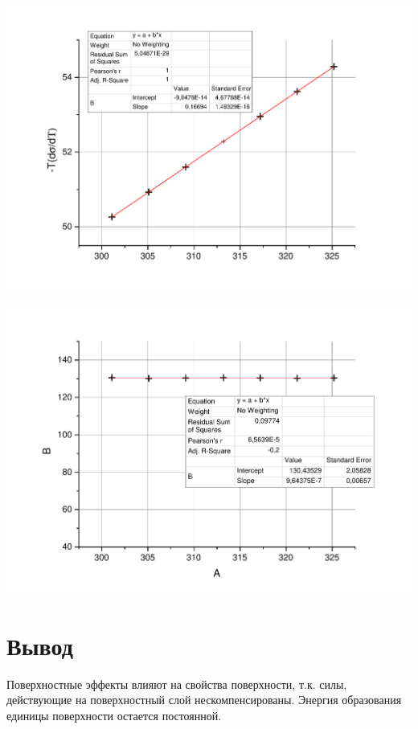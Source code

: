 \documentclass[a4paper,12pt]{article}
\begin{document}
	\includegraphics[width = 0.7\linewidth]{TdsigmadT}
	
	\includegraphics[width = 0.7\linewidth]{Up}
	\section{Вывод}
	Поверхностные эффекты влияют на свойства поверхности, т.к. силы, действующие на поверхностный слой нескомпенсированы. Энергия образования единицы поверхности остается постоянной. 
\end{document}
